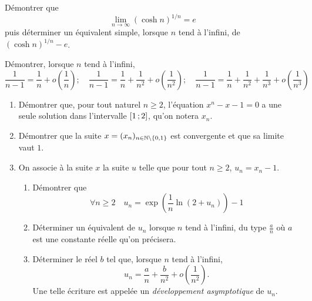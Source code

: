 \begin{exercice}
    Démontrer que \[\lim\limits_{n\to \infty} (\cosh n)^{1/n} = e\] puis déterminer un équivalent simple, lorsque \(n\) tend à l'infini, de \((\cosh n)^{1/n} - e\).
\end{exercice}
\begin{exercice}
    Démontrer, lorsque \(n\) tend à l'infini,
    \[ \frac{1}{n-1} = \frac{1}{n} + o\left(\frac{1}{n}\right); \quad \frac{1}{n-1} = \frac{1}{n} + \frac{1}{n^2} + o\left(\frac{1}{n^2}\right); \quad \frac{1}{n-1} = \frac{1}{n} + \frac{1}{n^2}+ \frac{1}{n^3} + o\left(\frac{1}{n^3}\right)\]
\end{exercice}
\begin{exercice}
    \begin{enumerate}
        \item Démontrer que, pour tout naturel \(n \geqslant 2\), l'équation \(x^n-x-1 = 0\) a une seule solution dans l'intervalle \(\left[ 1 \, ;  2 \right]\), qu'on notera \(x_n\).
        \item Démontrer que la suite \(x = (x_n)_{n \in \mathbb{N}\setminus\{0,1\}}\) est convergente et que sa limite vaut \(1\).
        \item On associe à la suite \(x\) la suite \(u\) telle que pour tout \(n \geqslant 2\), \(u_n = x_n-1\).
            \begin{enumerate}
                \item Démontrer que 
                    \[\forall n \geqslant 2 \quad u_n = \exp\left(\frac{1}{n}\ln(2+u_n)\right)-1\]
                \item Déterminer un équivalent de \(u_n\) lorsque \(n\) tend à l'infini, du type \(\frac{a}{n}\) où \(a\) est une constante réelle qu'on précisera.
                \item Déterminer le réel \(b\) tel que, lorsque \(n\) tend à l'infini,
                    \[u_n = \frac{a}{n} + \frac{b}{n^2} +o\left(\frac{1}{n^2}\right).\]
                    Une telle écriture est appelée un \emph{développement asymptotique} de \(u_n\).
            \end{enumerate}
    \end{enumerate}
\end{exercice}
